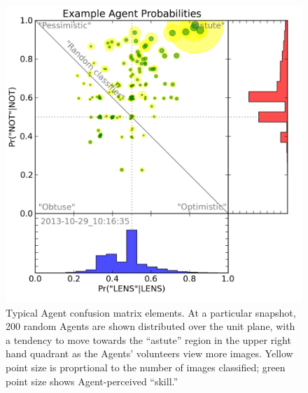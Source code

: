 \documentclass[useAMS,usenatbib,a4paper]{mn2e}
\begin{document}
\begin{figure}
\centering\includegraphics[width=0.9\linewidth]{sw-system-figs/CFHTLS_2013-10-29_10:16:35_probabilities.png}
\caption{Typical \SW Agent confusion matrix elements. At a particular
snapshot, 200 random Agents are shown distributed over the unit plane, with a
tendency to move towards the ``astute'' region in the upper right hand
quadrant as the Agents' volunteers view more images. Yellow point size is
proprtional to the number of images classified; green point size shows
Agent-perceived ``skill.''}
\label{fig:swap:agent-probabilities}
\end{figure}
\end{document}
